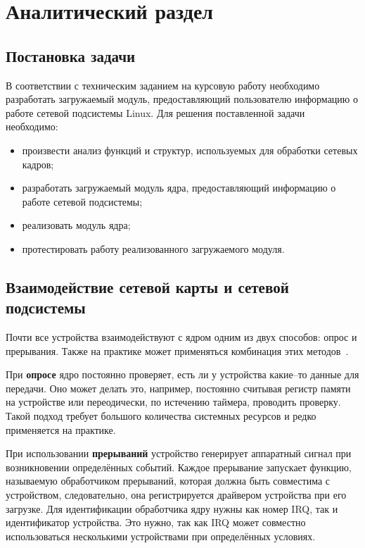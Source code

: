 \chapter{Аналитический раздел}

\section{Постановка задачи}

В соответствии с техническим заданием на курсовую работу необходимо разработать загружаемый модуль, предоставляющий пользователю информацию о работе сетевой подсистемы Linux. Для решения поставленной задачи необходимо:
\begin{itemize}[label=---]
	\item произвести анализ функций и структур, используемых для обработки сетевых кадров;
	\item разработать загружаемый модуль ядра, предоставляющий информацию о работе сетевой подсистемы;
	\item реализовать модуль ядра;
	\item протестировать работу реализованного загружаемого модуля.
\end{itemize}

\section{Взаимодействие сетевой карты и сетевой подсистемы}

Почти все устройства взаимодействуют с ядром одним из двух способов: опрос и прерывания. Также на практике может применяться комбинация этих методов~\cite{net}.

При \textbf{опросе} ядро постоянно проверяет, есть ли у устройства какие--то данные для передачи. Оно может делать это, например, постоянно считывая регистр памяти на устройстве или переодически, по истечению таймера, проводить проверку. Такой подход требует большого количества системных ресурсов и редко применяется на практике.

При использовании \textbf{прерываний} устройство генерирует аппаратный сигнал при возникновении определённых событий. Каждое прерывание запускает функцию, называемую обработчиком прерываний, которая должна быть совместима с
устройством, следовательно, она регистрируется драйвером устройства при его загрузке. Для идентификации обработчика ядру нужны как номер IRQ, так и идентификатор устройства. Это нужно, так как IRQ может совместно использоваться несколькими устройствами при определённых условиях.

